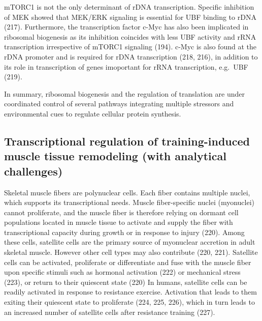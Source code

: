 \documentclass[twoside,10pt]{gihclass} %
\begin{document}
mTORC1 is not the only determinant of rDNA transcription. Specific inhibition of MEK showed that MEK/ERK signaling is essential for UBF binding to rDNA
(217).
Furthermore, the transcription factor c-Myc has also been implicated in ribosomal biogenesis as its inhibition coincides with less UBF activity and rRNA transcription irrespective of mTORC1 signaling
(194).
c-Myc is also found at the rDNA promoter and is required for rDNA transcription
(218, 216),
in addition to its role in transcription of genes imoportant for rRNA transcription, e.g.~UBF
(219).

In summary, ribosomal biogenesis and the regulation of translation are under coordinated control of several pathways integrating multiple stressors and environmental cues to regulate cellular protein synthesis.

\hypertarget{transcriptional-regulation-of-training-induced-muscle-tissue-remodeling-with-analytical-challenges}{%
\subsection{Transcriptional regulation of training-induced muscle tissue remodeling (with analytical challenges)}\label{transcriptional-regulation-of-training-induced-muscle-tissue-remodeling-with-analytical-challenges}}

Skeletal muscle fibers are polynuclear cells. Each fiber contains multiple nuclei, which supports its transcriptional needs. Muscle fiber-specific nuclei (myonuclei) cannot proliferate, and the muscle fiber is therefore relying on dormant cell populations located in muscle tissue to activate and supply the fiber with transcriptional capacity during growth or in response to injury
(220).
Among these cells, satellite cells are the primary source of myonuclear accretion in adult skeletal muscle.
However other cell types may also contribute
(220, 221).
Satellite cells can be activated, proliferate or differentiate and fuse with the muscle fiber upon specific stimuli such as hormonal activation
(222)
or mechanical stress
(223),
or return to their quiescent state
(220)
In humans, satellite cells can be readily activated in response to resistance exercise. Activation that leads to them exiting their quiescent state to proliferate
(224, 225, 226),
which in turn leads to an increased number of satellite cells after resistance training
(227).
\end{document}
